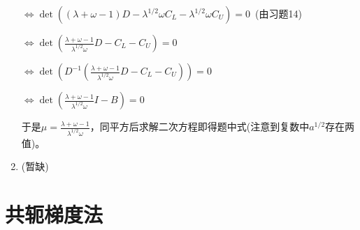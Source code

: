 \documentclass[a4paper,UTF8,fontset=windows]{ctexart}
\begin{document}
\begin{enumerate}
$\Leftrightarrow\det((\lambda+\omega-1)D-\lambda^{1/2}\omega C_L-\lambda^{1/2}\omega C_U)=0$\ (由习题14)

$\Leftrightarrow\det(\frac{\lambda+\omega-1}{\lambda^{1/2}\omega}D- C_L- C_U)=0$

$\Leftrightarrow\det(D^{-1}(\frac{\lambda+\omega-1}{\lambda^{1/2}\omega}D- C_L- C_U))=0$

$\Leftrightarrow\det(\frac{\lambda+\omega-1}{\lambda^{1/2}\omega}I-B)=0$

于是$\mu=\frac{\lambda+\omega-1}{\lambda^{1/2}\omega}$，同平方后求解二次方程即得题中式(注意到复数中$a^{1/2}$存在两值)。

\item
(暂缺)
\end{enumerate}

\section{共轭梯度法}
\end{document}
